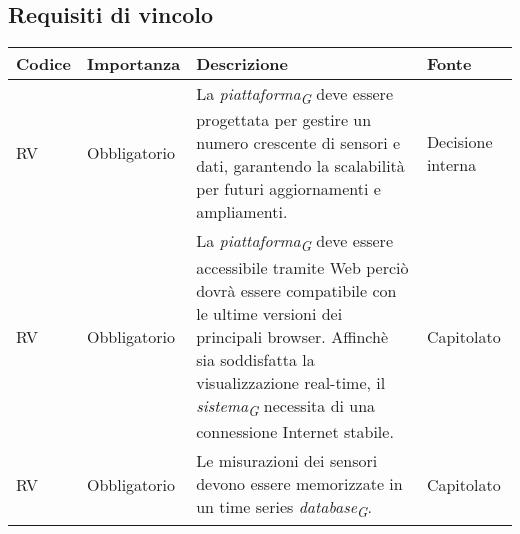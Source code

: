 \subsection{Requisiti di vincolo}
\setcounter{rowcounter}{0}
\begin{longtable}{|C{1.5cm}|C{2cm}|L{5cm}|C{2cm}|}
    \hline
    \textbf{Codice} & \textbf{Importanza} & \textbf{Descrizione} & \textbf{Fonte}  \\

    \hline
     RV & Obbligatorio & La \textit{piattaforma}\textsubscript{\textit{G}} deve essere progettata per gestire un numero crescente di sensori e dati, garantendo la scalabilità per futuri aggiornamenti e ampliamenti. & Decisione interna\\

    \hline
     RV & Obbligatorio & La \textit{piattaforma}\textsubscript{\textit{G}} deve essere accessibile tramite Web perciò dovrà essere compatibile con le ultime versioni dei principali browser. Affinchè sia soddisfatta la visualizzazione real-time, il \textit{sistema}\textsubscript{\textit{G}} necessita di una connessione Internet stabile. & Capitolato\\   

    \hline
     RV & Obbligatorio & Le misurazioni dei sensori devono essere memorizzate in un time series \textit{database}\textsubscript{\textit{G}}. & Capitolato\\   
    
    \hline
\end{longtable}




